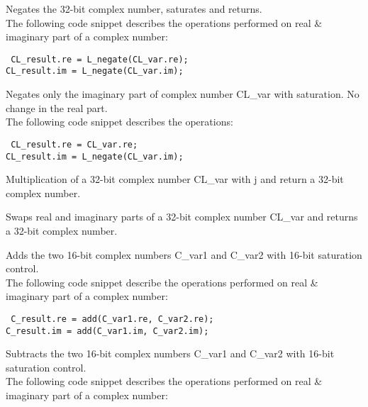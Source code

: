 
Negates the 32-bit complex number, saturates and returns.\\
The following code snippet describes the operations performed on real \& imaginary part of a complex number:

{\tt {} CL\_result.re = L\_negate(CL\_var.re);\\
      CL\_result.im = L\_negate(CL\_var.im);
}


Negates only the imaginary part of complex number CL\_var with saturation.
No change in the real part.\\
The following code snippet describes the operations:

{\tt {} CL\_result.re = CL\_var.re;\\
      CL\_result.im = L\_negate(CL\_var.im);
}


Multiplication of a 32-bit complex number CL\_var with j and return a 32-bit complex number.


Swaps real and imaginary parts of a 32-bit complex number CL\_var and returns a 32-bit complex number.


Adds the two 16-bit complex numbers C\_var1 and C\_var2 with 16-bit saturation control.\\
The following code snippet describe the operations performed on real \& imaginary part of a complex number:

{\tt {} C\_result.re = add(C\_var1.re, C\_var2.re);\\
      C\_result.im = add(C\_var1.im, C\_var2.im);
}


Subtracts the two 16-bit complex numbers C\_var1 and C\_var2 with 16-bit saturation control.\\
The following code snippet describes the operations performed on real \& imaginary part of a complex number:

